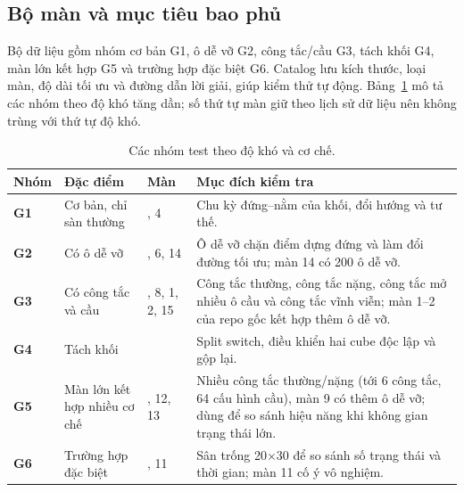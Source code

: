 \documentclass[a4paper]{article}
\begin{document}






\subsection{Bộ màn và mục tiêu bao phủ}
Bộ dữ liệu gồm nhóm cơ bản G1, ô dễ vỡ G2, công tắc/cầu G3, tách khối G4, màn lớn kết hợp G5 và trường hợp đặc biệt G6. Catalog lưu kích thước, loại màn, độ dài tối ưu và đường dẫn lời giải, giúp kiểm thử tự động. Bảng~\ref{tab:nhom-test} mô tả các nhóm theo độ khó tăng dần; số thứ tự màn giữ theo lịch sử dữ liệu nên không trùng với thứ tự độ khó.

\begin{table}[H]
\centering
\small
\renewcommand{\arraystretch}{1.4}
\setlength{\tabcolsep}{6pt}

\begin{tabularx}{\textwidth}{
    |>{\centering\arraybackslash\bfseries}p{1.3cm}
    |>{\raggedright\arraybackslash}p{3.2cm}
    |>{\centering\arraybackslash}p{1.8cm}
    |>{\raggedright\arraybackslash}X|
}
\hline
\rowcolor{blue!12}
Nhóm & \textbf{Đặc điểm} & \textbf{Màn} & \textbf{Mục đích kiểm tra} \\
\hline
G1 & Cơ bản, chỉ sàn thường & 3, 4 &
Chu kỳ đứng--nằm của khối, đổi hướng và tư thế. \\
\hline
G2 & Có ô dễ vỡ & 5, 6, 14 &
Ô dễ vỡ chặn điểm dựng đứng và làm đổi đường tối ưu; màn 14 có 200 ô dễ vỡ. \\
\hline
G3 & Có công tắc và cầu & 7, 8, 1, 2, 15 &
Công tắc thường, công tắc nặng, công tắc mở nhiều ô cầu và công tắc vĩnh viễn; màn 1--2 của repo gốc kết hợp thêm ô dễ vỡ. \\
\hline
G4 & Tách khối & 16 &
Split switch, điều khiển hai cube độc lập và gộp lại. \\
\hline
G5 & Màn lớn kết hợp nhiều cơ chế & 9, 12, 13 &
Nhiều công tắc thường/nặng (tới 6 công tắc, 64 cấu hình cầu), màn 9 có thêm ô dễ vỡ; dùng để so sánh hiệu năng khi không gian trạng thái lớn. \\
\hline
G6 & Trường hợp đặc biệt & 10, 11 &
Sân trống 20$\times$30 để so sánh số trạng thái và thời gian; màn 11 cố ý vô nghiệm. \\
\hline
\end{tabularx}

\caption{Các nhóm test theo độ khó và cơ chế.}
\label{tab:nhom-test}
\end{table}
\end{document}
